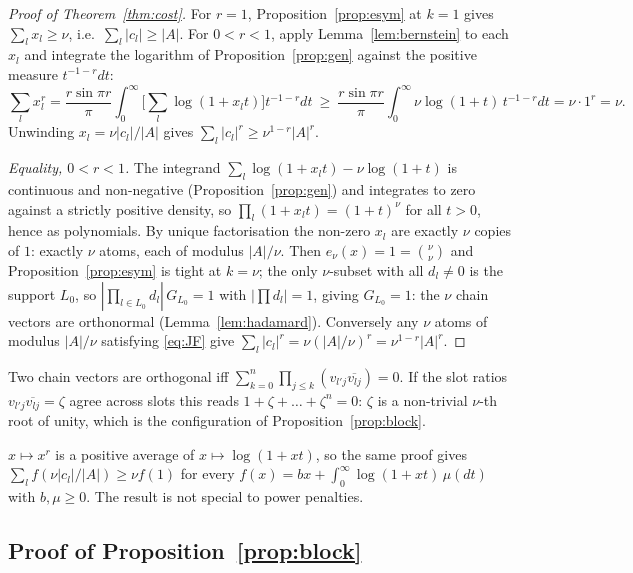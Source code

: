 \begin{proof}[Proof of Theorem~\ref{thm:cost}]
For $r=1$, Proposition~\ref{prop:esym} at $k=1$ gives $\sum_lx_l\ge\nu$, i.e.\ $\sum_l|c_l|\ge|A|$. For
$0<r<1$, apply Lemma~\ref{lem:bernstein} to each $x_l$ and integrate the logarithm of
Proposition~\ref{prop:gen} against the positive measure $t^{-1-r}dt$:
\[
\sum_lx_l^r=\frac{r\sin\pi r}\pi\int_0^\infty\Big[\sum_l\log(1+x_lt)\Big]t^{-1-r}dt
\ \ge\ \frac{r\sin\pi r}\pi\int_0^\infty\nu\log(1+t)\,t^{-1-r}dt=\nu\cdot1^r=\nu .
\]
Unwinding $x_l=\nu|c_l|/|A|$ gives $\sum_l|c_l|^r\ge\nu^{1-r}|A|^r$.

\emph{Equality, $0<r<1$.} The integrand $\sum_l\log(1+x_lt)-\nu\log(1+t)$ is continuous and non-negative
(Proposition~\ref{prop:gen}) and integrates to zero against a strictly positive density, so
$\prod_l(1+x_lt)=(1+t)^\nu$ for all $t>0$, hence as polynomials. By unique factorisation the non-zero $x_l$ are
exactly $\nu$ copies of $1$: exactly $\nu$ atoms, each of modulus $|A|/\nu$. Then $e_\nu(x)=1=\binom\nu\nu$ and
Proposition~\ref{prop:esym} is tight at $k=\nu$; the only $\nu$-subset with all $d_l\neq0$ is the support $L_0$,
so $|\prod_{l\in L_0}d_l|\,G_{L_0}=1$ with $|\prod d_l|=1$, giving $G_{L_0}=1$: the $\nu$ chain vectors are
orthonormal (Lemma~\ref{lem:hadamard}). Conversely any $\nu$ atoms of modulus $|A|/\nu$ satisfying \eqref{eq:JF}
give $\sum_l|c_l|^r=\nu(|A|/\nu)^r=\nu^{1-r}|A|^r$.
\end{proof}

\begin{remark}
Two chain vectors are orthogonal iff $\sum_{k=0}^n\prod_{j\le k}(v_{l'j}\overline{v_{lj}})=0$. If the slot ratios
$v_{l'j}\overline{v_{lj}}=\zeta$ agree across slots this reads $1+\zeta+\dots+\zeta^n=0$: $\zeta$ is a non-trivial
$\nu$-th root of unity, which is the configuration of Proposition~\ref{prop:block}.
\end{remark}

\begin{remark}
$x\mapsto x^r$ is a positive average of $x\mapsto\log(1+xt)$, so the same proof gives
$\sum_lf(\nu|c_l|/|A|)\ge\nu f(1)$ for every $f(x)=bx+\int_0^\infty\log(1+xt)\,\mu(dt)$ with $b,\mu\ge0$. The
result is not special to power penalties.
\end{remark}

\subsection{Proof of Proposition~\ref{prop:block}}
\label{app:block}

